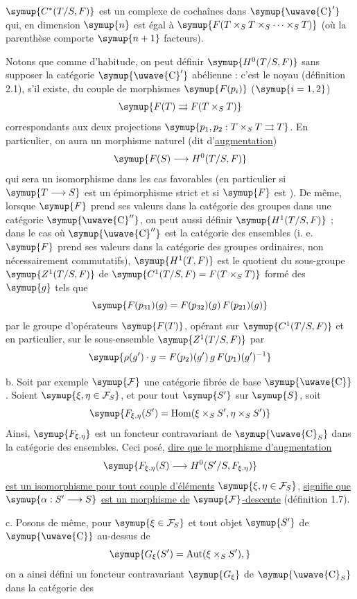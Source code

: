 $\symup{C^*(T/S,F)}$ est un complexe de cochaînes dans $\symup{\text{\uwave{C}}'}$ qui, en dimension
$\symup{n}$ est égal à $\symup{F(T\times_ST\times_S\cdots\times_ST)}$ (où la parenthèse comporte $\symup{n+1}$ facteurs).

Notons que comme d'habitude, on peut définir $\symup{H^0(T/S,F)}$ sans supposer la
catégorie $\symup{\text{\uwave{C}}'}$ abélienne : c'est le noyau (définition 2.1), s'il
existe, du couple de morphismes $\symup{F(p_i)}$ ($\symup{i=1,2}$)
\[
  \symup{F(T)\rightrightarrows F(T\times_ST)}
\]
correspondants aux deux projections
$\symup{p_1,p_2:T\times_ST\rightrightarrows T}$. En particulier, on aura un morphisme
naturel (dit d'\uline{augmentation})
\[
  \symup{F(S)\longrightarrow H^0(T/S,F)}
\]
qui sera un isomorphisme dans les cas favorables (en particulier si
$\symup{T\longrightarrow S}$ est un épimorphisme strict et si $\symup{F}$ est ). De même, lorsque $\symup{F}$ prend ses valeurs dans la catégorie des groupes
dans une catégorie $\symup{\text{\uwave{C}}''}$, on peut aussi définir $\symup{H^1(T/S,F)}$ ; dans le
cas où $\symup{\text{\uwave{C}}''}$ est la catégorie des ensembles (i. e. $\symup{F}$ prend ses
valeurs dans la catégorie des groupes ordinaires, non nécessairement
commutatifs), $\symup{H^1(T,F)}$ est le quotient du sous-groupe $\symup{Z^1(T/S,F)}$ de
$\symup{C^1(T/S,F)=F(T\times_ST)}$ formé des $\symup{g}$ tels que
\[
  \symup{F(p_{31})(g)=F(p_{32})(g)\,F(p_{21})(g)}
\]
par le groupe d'opérateurs $\symup{F(T)}$, opérant sur $\symup{C^1(T/S,F)}$ et en particulier,
sur le sous-ensemble $\symup{Z^1(T/S,F)}$ par
\[
  \symup{\rho(g')\cdot g=F(p_2)(g')\,g\,F(p_1)(g')^{-1}}
\]

\medskip\noindent
b. Soit par exemple $\symup{\mathcal F}$ une catégorie fibrée de base $\symup{\text{\uwave{C}}}$.
Soient $\symup{\xi,\eta\in\mathcal F_S}$, et pour tout $\symup{S'}$ sur $\symup{S}$, soit
\[
  \symup{F_{\xi,\eta}(S')=
  \operatorname{Hom}(\xi\times_SS',\eta\times_SS')}
\]
Ainsi, $\symup{F_{\xi,\eta}}$ est un foncteur contravariant de $\symup{\text{\uwave{C}}_S}$ dans la
catégorie des ensembles. Ceci posé, \uline{dire que le morphisme d'augmentation}
\[
  \symup{F_{\xi,\eta}(S)\longrightarrow H^0(S'/S,F_{\xi,\eta})}
\]
\uline{est un isomorphisme pour tout couple d'éléments} $\symup{\xi,\eta\in\mathcal F_S}$, \uline{signifie que} $\symup{\alpha:S'\longrightarrow S}$ \uline{est un morphisme de} $\symup{\mathcal F}$\uline{-descente}
(définition 1.7).

\medskip\noindent
c. Posons de même, pour $\symup{\xi\in\mathcal F_S}$ et tout objet $\symup{S'}$ de $\symup{\text{\uwave{C}}}$
au-dessus de
\[
  \symup{G_\xi(S')=\operatorname{Aut}(\xi\times_SS'),}
\]
on a ainsi défini un foncteur contravariant $\symup{G_\xi}$ de $\symup{\text{\uwave{C}}_S}$ dans la
catégorie des

